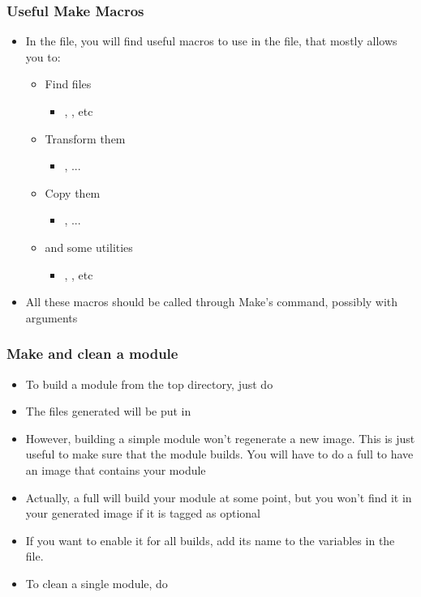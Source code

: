 \begin{frame}
  \frametitle{Useful Make Macros}
  \begin{itemize}
  \item In the  file, you will find
    useful macros to use in the  file, that mostly
    allows you to:
    \begin{itemize}
    \item Find files
      \begin{itemize}
      \item {}, , etc
      \end{itemize}
    \item Transform them
      \begin{itemize}
      \item {}, ...
      \end{itemize}
    \item Copy them
      \begin{itemize}
      \item {}, ...
      \end{itemize}
    \item and some utilities
      \begin{itemize}
      \item {}, , etc
      \end{itemize}
    \end{itemize}
  \item All these macros should be called through Make's  command,
    possibly with arguments
  \end{itemize}
\end{frame}

\begin{frame}
  \frametitle{Make and clean a module}
  \begin{itemize}
  \item To build a module from the top directory, just do
  \item The files generated will be put in
  \item However, building a simple module won't regenerate a new image.
    This is just useful to make sure that the module builds.
    You will have to do a full  to have an image that contains
    your module
  \item Actually, a full  will build your module at some
    point, but you won't find it in your generated image if it is
    tagged as optional
  \item If you want to enable it for all builds, add its name to the
     variables in the
     file.
  \item To clean a single module, do 
  \end{itemize}
\end{frame}
